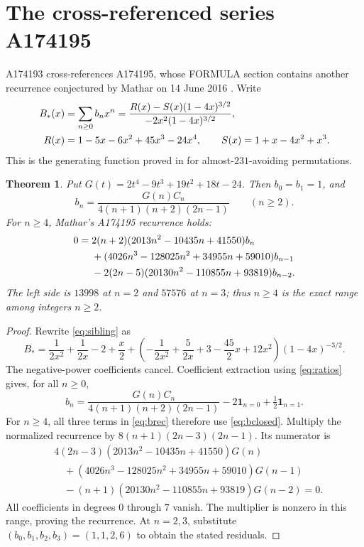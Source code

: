 \documentclass[10pt]{article}
\newtheorem{theorem}{Theorem}
\begin{document}
\section{The cross-referenced series A174195}
A174193 cross-references A174195, whose FORMULA section contains another
recurrence conjectured by Mathar on 14 June 2016 \cite{oeis195}. Write
\begin{align}
 B_*(x)&=\sum_{n\geq0}b_nx^n
 =\frac{R(x)-S(x)(1-4x)^{3/2}}{-2x^2(1-4x)^{3/2}},\label{eq:sibling}\\
 R(x)&=1-5x-6x^2+45x^3-24x^4,\qquad S(x)=1+x-4x^2+x^3.\notag
\end{align}
This is the generating function proved in \cite[Theorem~9]{almost} for
almost-$231$-avoiding permutations.
\begin{theorem}\label{thm:sibling}
Put $G(t)=2t^4-9t^3+19t^2+18t-24$. Then $b_0=b_1=1$, and
\begin{equation}
 b_n=\frac{G(n)C_n}{4(n+1)(n+2)(2n-1)}\qquad(n\geq2).\label{eq:bclosed}
\end{equation}
For $n\geq4$, Mathar's A174195 recurrence holds:
\begin{align}
0={}&2(n+2)(2013n^2-10435n+41550)b_n\notag\\
&+(4026n^3-128025n^2+34955n+59010)b_{n-1}\notag\\
&-2(2n-5)(20130n^2-110855n+93819)b_{n-2}.\label{eq:brec}
\end{align}
The left side is $13998$ at $n=2$ and $57576$ at $n=3$;
thus $n\geq4$ is the exact range among integers $n\geq2$.
\end{theorem}
\begin{proof}
Rewrite \eqref{eq:sibling} as
\[
 B_* =\frac1{2x^2}+\frac1{2x}-2+\frac x2
 +\left(-\frac1{2x^2}+\frac5{2x}+3-\frac{45}2x+12x^2\right)(1-4x)^{-3/2}.
\]
The negative-power coefficients cancel. Coefficient extraction using
\eqref{eq:ratios} gives, for all $n\geq0$,
\[
 b_n=\frac{G(n)C_n}{4(n+1)(n+2)(2n-1)}
       -2\mathbf1_{n=0}+\tfrac12\mathbf1_{n=1}.
\]
For $n\geq4$, all three terms in \eqref{eq:brec} therefore use
\eqref{eq:bclosed}. Multiply the normalized recurrence by
$8(n+1)(2n-3)(2n-1)$. Its numerator is
\begin{align*}
 &4(2n-3)(2013n^2-10435n+41550)G(n)\\
 &\quad +(4026n^3-128025n^2+34955n+59010)G(n-1)\\
 &\quad -(n+1)(20130n^2-110855n+93819)G(n-2)=0.
\end{align*}
All coefficients in degrees $0$ through $7$ vanish. The multiplier is
nonzero in this range, proving the recurrence. At $n=2,3$, substitute
$(b_0,b_1,b_2,b_3)=(1,1,2,6)$ to obtain the stated residuals.
\end{proof}
\end{document}
